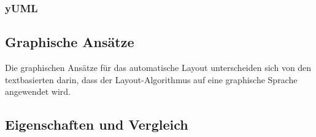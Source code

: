 
\subsubsection{yUML}


\subsection{Graphische Ansätze}

Die graphischen Ansätze für das automatische Layout unterscheiden sich von den textbasierten darin, dass der Layout-Algorithmus auf eine graphische Sprache angewendet wird.










\subsection{Eigenschaften und Vergleich}


